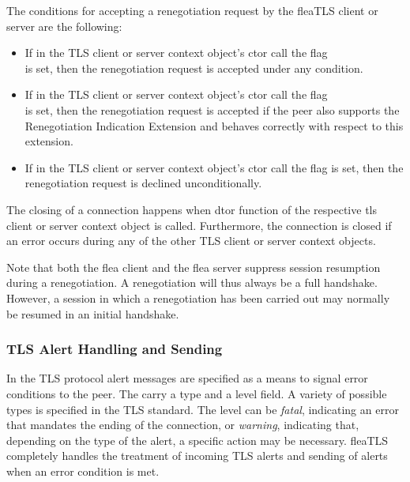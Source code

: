 \documentclass[a4paper,11pt]{scrartcl}
\begin{document}
  The conditions for accepting a renegotiation request by the  fleaTLS client or
  server are the following:
  \begin{itemize}
    \item If in the TLS client or server context object's ctor call the flag \\ is
      set, then the renegotiation request is accepted under any condition.
    \item If in the TLS client or server context object's ctor call the flag \\ is
      set, then the renegotiation request is accepted if the peer also supports
      the Renegotiation Indication Extension and behaves correctly with respect
      to this extension.
      \item If in the TLS client or server context object's ctor call the flag  is
      set, then the renegotiation request is declined unconditionally.
  \end{itemize}

  The closing of a connection happens when dtor function of the respective tls
  client or server context object is called. Furthermore, the connection is
  closed if an error occurs during any of the other TLS client or server context
  objects.

  Note that both the flea client and the flea server suppress session resumption
  during a renegotiation. A renegotiation will thus always be a full handshake.
  However, a session in which a renegotiation has been carried out may normally
  be resumed in an initial handshake.
  

  \subsubsection{TLS Alert Handling and Sending }

  In the TLS protocol alert messages are specified as a means to signal error
  conditions to the peer. The carry a type and a level field. A variety of possible types
  is specified in the TLS standard. The level can be \emph{fatal}, indicating an error
  that mandates the ending of the connection, or \emph{warning}, indicating that,
  depending on the type of the alert, a specific action may be necessary.
  fleaTLS completely handles the treatment of incoming
  TLS alerts and sending of alerts when an error condition is met.
\end{document}
